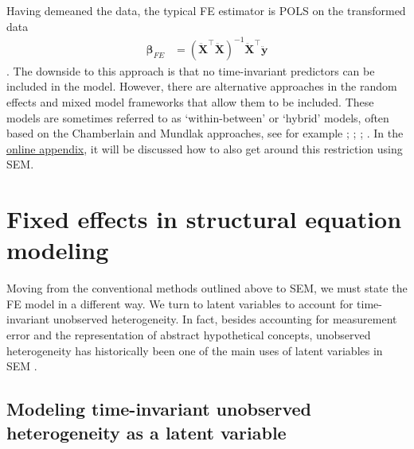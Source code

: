 \documentclass[]{interact}
\theoremstyle{plain}%
\theoremstyle{definition}
\theoremstyle{remark}
\begin{document}
Having demeaned the data, the typical FE estimator is POLS on the
transformed data \begin{align}
\bm{\beta}_{FE} & = (\ddot{\bm{X}}^{\intercal}\ddot{\bm{X}})^{-1}\ddot{\bm{X}}^{\intercal}\ddot{\bm{y}}
\end{align} \citep{Bruederl2015}. The downside to this approach is that
no time-invariant predictors can be included in the model. However,
there are alternative approaches in the random effects and mixed model
frameworks that allow them to be included. These models are sometimes
referred to as `within-between' or `hybrid' models, often based on the
Chamberlain \citeyearpar{Chamberlain1980} and Mundlak
\citeyearpar{Mundlak1978} approaches, see for example \citet{Bell2018};
\citet{Allison2011}; \citet{Schunck2013}; \citet{Enders2007}. In the
\href{https://github.com/henrik-andersen/FE-SEM/blob/master/extensions.pdf}{online
appendix}, it will be discussed how to also get around this restriction
using SEM.

\hypertarget{fe-sem}{%
\section{Fixed effects in structural equation modeling}\label{fe-sem}}

Moving from the conventional methods outlined above to SEM, we must
state the FE model in a different way. We turn to latent variables to
account for time-invariant unobserved heterogeneity. In fact, besides
accounting for measurement error and the representation of abstract
hypothetical concepts, unobserved heterogeneity has historically been
one of the main uses of latent variables in SEM \citep{Skrondal2004}.

\hypertarget{modeling-time-invariant-unobserved-heterogeneity-as-a-latent-variable}{%
\subsection{Modeling time-invariant unobserved heterogeneity as a latent
variable}\label{modeling-time-invariant-unobserved-heterogeneity-as-a-latent-variable}}
\end{document}
